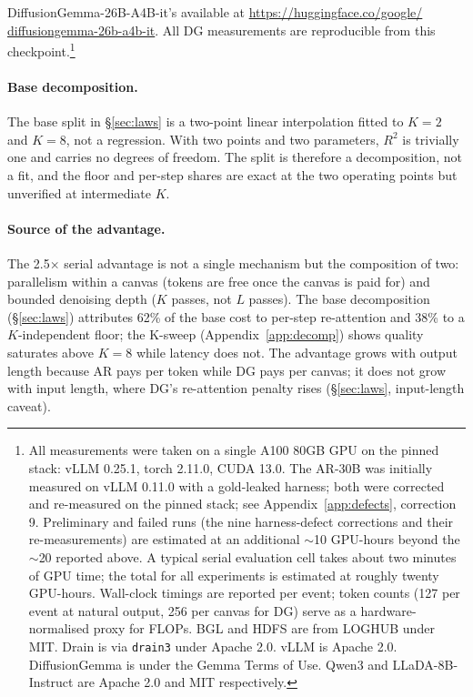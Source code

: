 DiffusionGemma-26B-A4B-it's available at
\url{https://huggingface.co/google/}\\\url{diffusiongemma-26b-a4b-it}.
All DG measurements are reproducible from this checkpoint.\footnote{All
measurements were taken on a single A100 80GB GPU on the pinned stack:
vLLM 0.25.1, torch 2.11.0, CUDA 13.0. The AR-30B was initially
measured on vLLM 0.11.0 with a gold-leaked harness; both were corrected
and re-measured on the pinned stack; see Appendix~\ref{app:defects},
correction 9. Preliminary and failed runs (the nine harness-defect
corrections and their re-measurements) are estimated at an additional
$\sim$10 GPU-hours beyond the $\sim$20 reported above. A typical serial
evaluation cell takes about two minutes of GPU time; the total for all
experiments is estimated at roughly twenty GPU-hours. Wall-clock
timings are reported per event; token counts (127 per event at natural
output, 256 per canvas for DG) serve as a hardware-normalised proxy
for FLOPs. BGL and HDFS are from LOGHUB under MIT. Drain is via
\texttt{drain3} under Apache 2.0. vLLM is Apache 2.0. DiffusionGemma
is under the Gemma Terms of Use. Qwen3 and LLaDA-8B-Instruct are
Apache 2.0 and MIT respectively.}

\paragraph{Base decomposition.}

The base split in \S\ref{sec:laws} is a two-point linear interpolation
fitted to $K{=}2$ and $K{=}8$, not a regression. With two points and
two parameters, $R^2$ is trivially one and carries no degrees of
freedom. The split is therefore a decomposition, not a fit, and the
floor and per-step shares are exact at the two operating points but
unverified at intermediate $K$.

\paragraph{Source of the advantage.}

The 2.5$\times$ serial advantage is not a single mechanism but the
composition of two: parallelism within a canvas (tokens are free once
the canvas is paid for) and bounded denoising depth ($K$ passes, not
$L$ passes). The base decomposition (\S\ref{sec:laws}) attributes
62\% of the base cost to per-step re-attention and 38\% to a
$K$-independent floor; the K-sweep (Appendix~\ref{app:decomp}) shows
quality saturates above $K{=}8$ while latency does not. The advantage
grows with output length because AR pays per token while DG pays per
canvas; it does not grow with input length, where DG's re-attention
penalty rises (\S\ref{sec:laws}, input-length caveat).

